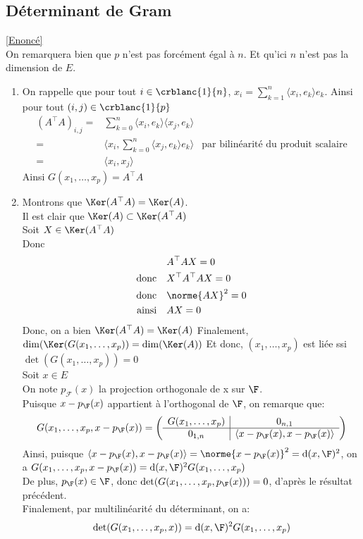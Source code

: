 \documentclass[8pt]{book}
\begin{document}
	\subsection{Déterminant de Gram}
	\label{Déterminant de Gram corrigé}
	\textcolor{blue}{\hyperref[Déterminant de Gram]{[Enoncé]}}\\
	On remarquera bien que $p$ n'est pas forcément égal à $n$. Et qu'ici $n$ n'est pas la dimension de $E$.
	\begin{enumerate}
		\item On rappelle que pour tout $i\in\crblanc{1}{n}$, $x_i=\displaystyle\sum_{k=1}^n\langle x_i,e_k\rangle e_k$.
		Ainsi pour tout $(i,j)\in\crblanc{1}{p}$\begin{align*}
			(A^\top A)_{i,j}=&\sum_{k=0}^n\langle x_i,e_k\rangle\langle x_j,e_k\rangle\\
			=&\langle x_i,\sum_{k=0}^n\langle x_j,e_k\rangle e_k\rangle &\text{par bilinéarité du produit scalaire}\\
			=&\langle x_i,x_j\rangle
		\end{align*}
		Ainsi $G(x_1,\dots,x_p)=A^\top A$
		\item Montrons que $\Ker(A^\top A)=\Ker(A)$.
		\\Il est clair que $\Ker(A)\subset\Ker(A^\top A)$
		\\Soit $X\in\Ker(A^\top A)$
		\\Donc \begin{align*}
			&A^\top AX=0\\
			\text{donc}\quad&X^\top A^\top AX=0\\
			\text{donc}\quad&\norme{AX}^2=0\\
			\text{ainsi}\quad&AX=0
		\end{align*}
		Donc, on a bien $\Ker(A^\top A)=\Ker(A)$
		Finalement, $\dim(\Ker(G(x_1,\dots,x_p))=\dim(\Ker(A))$
		Et donc, $(x_1,\dots,x_p)$ est liée ssi $\det(G(x_1,\dots,x_p))=0$
		\\Soit $x\in E$
		\\On note $p_\mathcal{F}(x)$ la projection orthogonale de x sur $\F$.
		\\Puisque $x-p_\F(x)$ appartient à l'orthogonal de $\F$, on remarque que: $$G(x_1,\dots,x_p,x-p_\F(x))=\left(\begin{array}{c|c}
			G(x_1,\dots,x_p)&0_{n,1}\\
			\hline
			0_{1,n}&\langle x-p_\F(x),x-p_\F(x)\rangle
		\end{array}\right)$$
		Ainsi, puisque $\langle x-p_\F(x),x-p_\F(x)\rangle=\norme{x-p_\F(x)}^2=\text{d}(x,\F)^2$, on a $G(x_1,\dots,x_p,x-p_\F(x))=\text{d}(x,\F)^2G(x_1,\dots,x_p)$
		\\De plus, $p_\F(x)\in\F$, donc $\det(G(x_1,\dots,x_p,p_\F(x)))=0$, d'après le résultat précédent.
		\\Finalement, par multilinéarité du déterminant, on a: $$\det(G(x_1,\dots,x_p,x))=\text{d}(x,\F)^2G(x_1,\dots,x_p)$$
	\end{enumerate}
	
\end{document}
